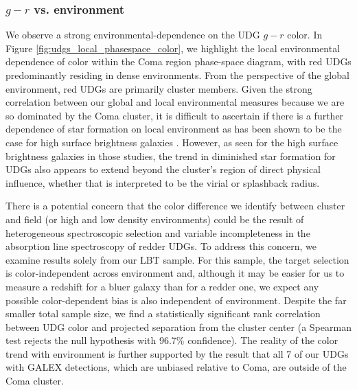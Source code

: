 \documentclass[twocolumn,tighten]{aastex63}
\begin{document}
\subsubsection{$g-r$ vs. environment}
We observe a strong environmental-dependence on the UDG $g-r$ color. In Figure \ref{fig:udgs_local_phasespace_color}, we highlight the local environmental dependence of color within the Coma region phase-space diagram, with red UDGs predominantly residing in dense environments. From the perspective of the global environment, red UDGs are primarily cluster members. Given the strong correlation between our global and local environmental measures because we are so dominated by the Coma cluster, it is difficult to ascertain if there is a further dependence of star formation on local environment as has been shown to be the case for high surface brightness galaxies \citep{Lewis2002,Gomez2003}. However, as seen for the high surface brightness galaxies in those studies, the trend in diminished star formation for UDGs also appears to extend beyond the cluster's region of direct physical influence, whether that is interpreted to be the virial or splashback radius.

There is a potential concern that the color difference we identify between cluster and field (or high and low density environments) could be the result of heterogeneous spectroscopic selection and variable incompleteness in the absorption line spectroscopy of redder UDGs.
To address this concern, we examine results solely from our LBT sample. For this sample, the target selection is color-independent across environment and, although
it may be easier for us to measure a redshift for a bluer galaxy than for a redder one, we expect 
any possible color-dependent bias is also independent of %
environment. %
Despite the far smaller total sample size, we find 
a statistically significant rank correlation between UDG color and projected separation from the cluster center (a Spearman test rejects the null hypothesis with 96.7\% confidence).
The reality of the color trend with environment is further supported by the result that all 7 of our UDGs with GALEX detections, which are unbiased relative to Coma, are outside of the Coma cluster.
\end{document}
